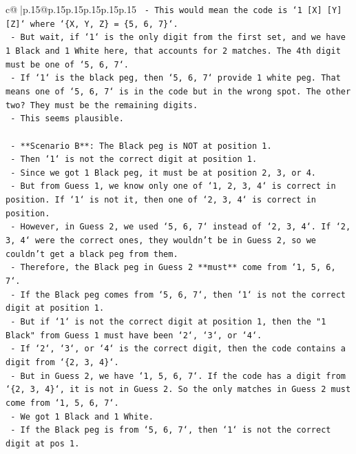 \documentclass{article}
\begin{document}
{\begin{supertabular}{c@{$\;$}|p{.15\linewidth}@{}p{.15\linewidth}p{.15\linewidth}p{.15\linewidth}p{.15\linewidth}p{.15\linewidth}}
{{{\texttt{        {-}   This would mean the code is `1 {[}X{]} {[}Y{]} {[}Z{]}` where `\{X, Y, Z\} = \{5, 6, 7\}`.} \\
\texttt{        {-}   But wait, if `1` is the only digit from the first set, and we have 1 Black and 1 White here, that accounts for 2 matches. The 4th digit must be one of `5, 6, 7`.} \\
\texttt{        {-}   If `1` is the black peg, then `5, 6, 7` provide 1 white peg. That means one of `5, 6, 7` is in the code but in the wrong spot. The other two? They must be the remaining digits.} \\
\texttt{        {-}   This seems plausible.} \\
\\ 
\texttt{    {-}   **Scenario B**: The Black peg is NOT at position 1.} \\
\texttt{        {-}   Then `1` is not the correct digit at position 1.} \\
\texttt{        {-}   Since we got 1 Black peg, it must be at position 2, 3, or 4.} \\
\texttt{        {-}   But from Guess 1, we know only one of `1, 2, 3, 4` is correct in position. If `1` is not it, then one of `2, 3, 4` is correct in position.} \\
\texttt{        {-}   However, in Guess 2, we used `5, 6, 7` instead of `2, 3, 4`. If `2, 3, 4` were the correct ones, they wouldn't be in Guess 2, so we couldn't get a black peg from them.} \\
\texttt{        {-}   Therefore, the Black peg in Guess 2 **must** come from `1, 5, 6, 7`.} \\
\texttt{        {-}   If the Black peg comes from `5, 6, 7`, then `1` is not the correct digit at position 1.} \\
\texttt{        {-}   But if `1` is not the correct digit at position 1, then the "1 Black" from Guess 1 must have been `2`, `3`, or `4`.} \\
\texttt{        {-}   If `2`, `3`, or `4` is the correct digit, then the code contains a digit from `\{2, 3, 4\}`.} \\
\texttt{        {-}   But in Guess 2, we have `1, 5, 6, 7`. If the code has a digit from `\{2, 3, 4\}`, it is not in Guess 2. So the only matches in Guess 2 must come from `1, 5, 6, 7`.} \\
\texttt{        {-}   We got 1 Black and 1 White.} \\
\texttt{        {-}   If the Black peg is from `5, 6, 7`, then `1` is not the correct digit at pos 1.} \\
}}}
\end{supertabular}}
\end{document}
